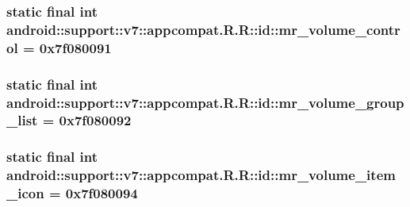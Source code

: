 \hypertarget{classandroid_1_1support_1_1v7_1_1appcompat_1_1_r_1_1id_72c1d94d5ec1079089231398964bda32}{
\subsubsection[{mr\_\-volume\_\-control}]{\setlength{\rightskip}{0pt plus 5cm}static final int android::support::v7::appcompat.R.R::id::mr\_\-volume\_\-control = 0x7f080091}}
\label{classandroid_1_1support_1_1v7_1_1appcompat_1_1_r_1_1id_72c1d94d5ec1079089231398964bda32}


\hypertarget{classandroid_1_1support_1_1v7_1_1appcompat_1_1_r_1_1id_84c9816e510c96b7a06224a042c5c3de}{
\subsubsection[{mr\_\-volume\_\-group\_\-list}]{\setlength{\rightskip}{0pt plus 5cm}static final int android::support::v7::appcompat.R.R::id::mr\_\-volume\_\-group\_\-list = 0x7f080092}}
\label{classandroid_1_1support_1_1v7_1_1appcompat_1_1_r_1_1id_84c9816e510c96b7a06224a042c5c3de}


\hypertarget{classandroid_1_1support_1_1v7_1_1appcompat_1_1_r_1_1id_60ba2bd887cbe8169b0fb367c28bb773}{
\subsubsection[{mr\_\-volume\_\-item\_\-icon}]{\setlength{\rightskip}{0pt plus 5cm}static final int android::support::v7::appcompat.R.R::id::mr\_\-volume\_\-item\_\-icon = 0x7f080094}}
\label{classandroid_1_1support_1_1v7_1_1appcompat_1_1_r_1_1id_60ba2bd887cbe8169b0fb367c28bb773}


